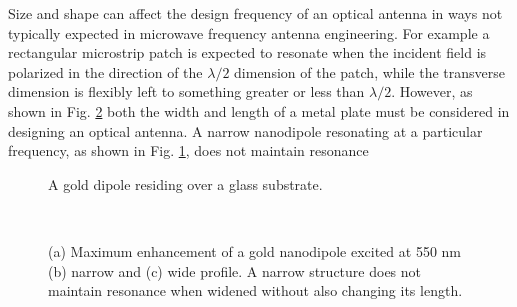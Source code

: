 \documentclass[11pt]{article}
\begin{document}
Size and shape can affect the design frequency of an optical antenna in ways not typically expected in microwave frequency antenna engineering. For example a rectangular microstrip patch is expected to resonate when the incident field is polarized in the direction of the $\lambda/2$ dimension of the patch, while the transverse dimension is flexibly left to something greater or less than $\lambda/2$. However, as shown in Fig. \ref{fig:simulation} both the width and length of a metal plate must be considered in designing an optical antenna. A narrow nanodipole resonating at a particular frequency, as shown in Fig. \ref{fig:nitin_dipole}, does not maintain resonance
%
\begin{figure}[b!]
  \centering
  \def\svgwidth{.75\linewidth}
  
  \caption{A gold dipole residing over a glass substrate.}
  \label{fig:nitin_dipole}
\end{figure}
%
\begin{figure}[t!]
  \centering
  \\
  \centering
   \hfil
   \hfil
  \caption{(a) Maximum enhancement of a gold nanodipole excited at 550 nm (b) narrow and (c) wide profile. A narrow structure does not maintain resonance when widened without also changing its length.}
  \label{fig:simulation}
\end{figure}
\end{document}
